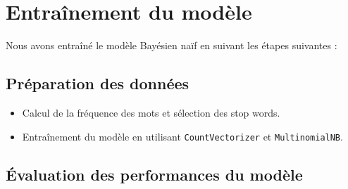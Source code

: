 \section{Entraînement du modèle}

Nous avons entraîné le modèle Bayésien naïf en suivant les étapes suivantes :

\subsection{Préparation des données}

\begin{itemize}
    \item Calcul de la fréquence des mots et sélection des stop words.
    \item Entraînement du modèle en utilisant \texttt{CountVectorizer} et \texttt{MultinomialNB}.
\end{itemize}

\subsection{Évaluation des performances du modèle}



